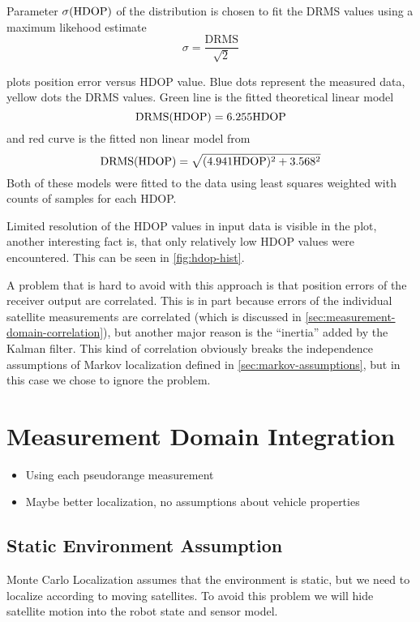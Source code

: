 Parameter \(\sigma(\mathrm{HDOP})\) of the distribution is chosen to fit the DRMS values using a maximum likehood estimate
\begin{equation}
	\sigma = \frac{\mathrm{DRMS}}{\sqrt{2}}
\end{equation}

 plots position error versus HDOP value.
Blue dots represent the measured data, yellow dots the DRMS values.
Green line is the fitted theoretical linear model
\begin{equation}
\mathrm{DRMS}(\mathrm{HDOP}) = \num{6.255} \mathrm{HDOP}
\end{equation}
and red curve is the fitted non linear model from \cite{www-wilson}
\begin{equation}
\mathrm{DRMS}(\mathrm{HDOP}) = \sqrt{(\num{4.941}\mathrm{HDOP})^2 + \num{3.568}^2}
\end{equation}
Both of these models were fitted to the data using least squares weighted with counts of samples
for each HDOP.

Limited resolution of the HDOP values in input data is visible in the plot,
another interesting fact is, that only relatively low HDOP values were encountered.
This can be seen in \cref{fig:hdop-hist}.

A problem that is hard to avoid with this approach is that position errors of the
receiver output are correlated.
This is in part because errors of the individual satellite measurements are correlated
(which is discussed in \ref{sec:measurement-domain-correlation}), but another major reason
is the \enquote{inertia} added by the Kalman filter.
This kind of correlation obviously breaks the independence assumptions of Markov
localization defined in \ref{sec:markov-assumptions}, but in this case we chose to ignore
the problem. 

\section{Measurement Domain Integration}
\label{sec:measurement-domain}

\begin{itemize}
\item Using each pseudorange measurement
\item Maybe better localization, no assumptions about vehicle properties
\end{itemize}

\subsection{Static Environment Assumption}
\label{sec:gps-mcl-static-env}
Monte Carlo Localization assumes that the environment is static, but we need to
localize according to moving satellites.
To avoid this problem we will hide satellite motion into the robot state and sensor model.

